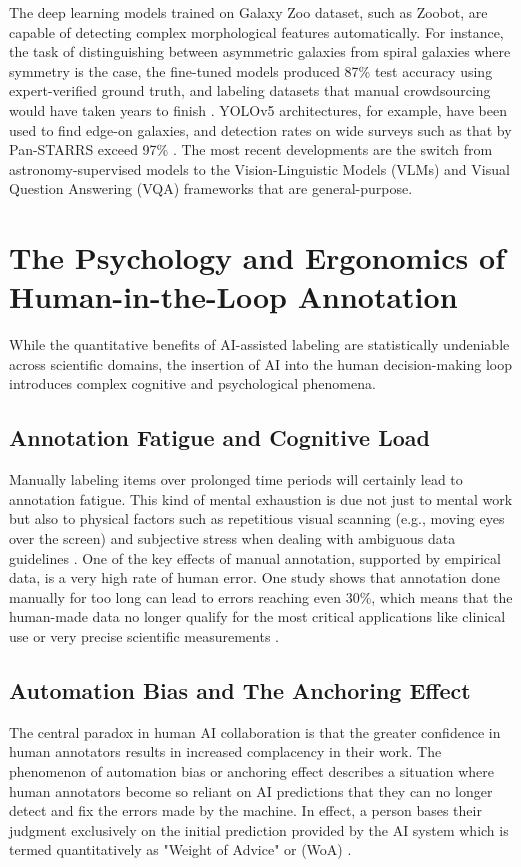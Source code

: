 \documentclass[10pt, conference, letterpaper]{IEEEtran}
\begin{document}
The deep learning models trained on Galaxy Zoo dataset, such as Zoobot, are capable of detecting complex morphological features automatically. For instance, the task of distinguishing between asymmetric galaxies from spiral galaxies where symmetry is the case, the fine-tuned models produced 87\% test accuracy using expert-verified ground truth, and labeling datasets that manual crowdsourcing would have taken years to finish \cite{ref39}. YOLOv5 architectures, for example, have been used to find edge-on galaxies, and detection rates on wide surveys such as that by Pan-STARRS exceed 97\% \cite{ref40}. The most recent developments are the switch from astronomy-supervised models to the Vision-Linguistic Models (VLMs) and Visual Question Answering (VQA) frameworks that are general-purpose.

\section{The Psychology and Ergonomics of Human-in-the-Loop Annotation}
\label{sec:psych}
While the quantitative benefits of AI-assisted labeling are statistically undeniable across scientific domains, the insertion of AI into the human decision-making loop introduces complex cognitive and psychological phenomena.

\subsection{Annotation Fatigue and Cognitive Load}
Manually labeling items over prolonged time periods will certainly lead to annotation fatigue. This kind of mental exhaustion is due not just to mental work but also to physical factors such as repetitious visual scanning (e.g., moving eyes over the screen) and subjective stress when dealing with ambiguous data guidelines \cite{ref50}.
One of the key effects of manual annotation, supported by empirical data, is a very high rate of human error. One study shows that annotation done manually for too long can lead to errors reaching even 30\%, which means that the human-made data no longer qualify for the most critical applications like clinical use or very precise scientific measurements \cite{ref52}.

\subsection{Automation Bias and The Anchoring Effect}
The central paradox in human AI collaboration is that the greater confidence in human annotators results in increased complacency in their work. The phenomenon of automation bias or anchoring effect describes a situation where human annotators become so reliant on AI predictions that they can no longer detect and fix the errors made by the machine.
In effect, a person bases their judgment exclusively on the initial prediction provided by the AI system which is termed quantitatively as "Weight of Advice" or (WoA) \cite{ref56}.
\end{document}
